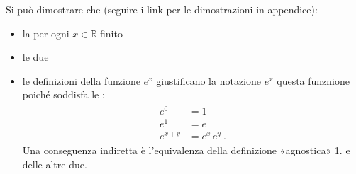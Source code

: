 \documentclass[letterpaper,10pt,italian]{jupyterBook}
\begin{document}
\sphinxAtStartPar
Si può dimostrare che (seguire i link per le dimostrazioni in appendice):
\begin{itemize}
\item {} 
\sphinxAtStartPar
la {\hyperref[\detokenize{ch/precalculus/exponential_logarithm-notes:math-hs-exp-log-notes-convergence}]{}} per ogni \(x \in \mathbb{R}\) finito

\item {} 
\sphinxAtStartPar
le due {\hyperref[\detokenize{ch/precalculus/exponential_logarithm-notes:math-hs-exp-log-notes-equivalence}]{}}

\item {} 
\sphinxAtStartPar
le definizioni della funzione \(e^x\) giustificano la notazione \(e^x\) questa funznione poiché soddisfa le {\hyperref[\detokenize{ch/precalculus/exponential_logarithm-notes:math-hs-exp-log-notes-powers}]{}}:
\begin{equation*}
\begin{split}\begin{aligned}
    e^0 & = 1 \\
    e^1 & = e \\
    e^{x+y} & = e^x \, e^y \ .
  \end{aligned}\end{split}
\end{equation*}
\sphinxAtStartPar
Una conseguenza indiretta è l’equivalenza della definizione «agnostica» 1. e delle altre due.

\end{itemize}
\end{document}
